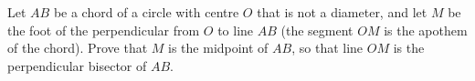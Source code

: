 Let $AB$ be a chord of a circle with centre $O$ that is not a diameter, and let $M$ be the foot of the perpendicular from $O$ to line $AB$ (the segment $OM$ is the apothem of the chord). Prove that $M$ is the midpoint of $AB$, so that line $OM$ is the perpendicular bisector of $AB$.
